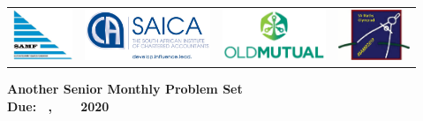 \documentclass{article}
\begin{document}
\setlength{\tabcolsep}{5pt}
\begin{center} \begin{tabular}{cccc}
	\includegraphics[height=43pt]{SAMF_logo.jpg} &
	\includegraphics[height=43pt]{SAICA_logo.jpg} &
	\includegraphics[height=43pt]{OM_Logo_Stacked_Vignette_on_White_RGB.jpg} &
	\includegraphics[height=43pt]{SAMO2019.png}
\end{tabular} \end{center}

\bigskip

\begin{center}
\textbf{\Large Another Senior Monthly Problem Set}
\\ \vspace{1em}
\textbf{\large Due: ~, ~ ~ 2020}
\end{center}
\end{document}
